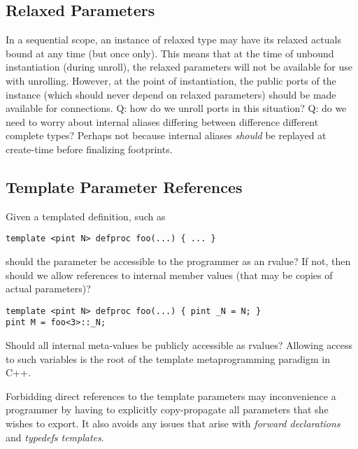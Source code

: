 \subsection{Relaxed Parameters}
\label{sec:templates:issues:relaxed}

In a sequential scope, an instance of relaxed type
may have its relaxed actuals bound at any time (but once only).  
This means that at the time of unbound instantiation (during unroll), 
the relaxed parameters will not be available for use with unrolling.
However, at the point of instantiation, the public ports
of the instance (which should never depend on relaxed parameters)
should be made available for connections.  
Q: how do we unroll ports in this situation?
Q: do we need to worry about internal aliases differing between
difference different complete types?  Perhaps not because internal
aliases \emph{should} be replayed at create-time before
finalizing footprints.  

\subsection{Template Parameter References}
\label{sec:templates:issues:param_ref}

Given a templated definition, such as

\begin{verbatim}
template <pint N> defproc foo(...) { ... }
\end{verbatim}

should the parameter  be accessible to the programmer
as an rvalue?
If not, then should we allow references to internal member values
(that may be copies of actual parameters)?

\begin{verbatim}
template <pint N> defproc foo(...) { pint _N = N; }
pint M = foo<3>::_N;
\end{verbatim}

Should all internal meta-values be publicly accessible as rvalues?
Allowing access to such variables is the root of the template
metaprogramming paradigm in C++.  

Forbidding direct references to the template parameters may 
inconvenience a programmer by having to explicitly copy-propagate
all parameters that she wishes to export.  
It also avoids any issues that arise with \emph{forward declarations}
and \emph{typedefs templates}.  

